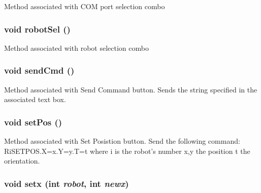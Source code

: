 Method associated with COM port selection combo \hypertarget{classMainWindow_50c5e9556f3dfc6de8e0b064d10aa21f}{
\subsubsection[robotSel]{\setlength{\rightskip}{0pt plus 5cm}void robot\-Sel ()}}
\label{classMainWindow_50c5e9556f3dfc6de8e0b064d10aa21f}


Method associated with robot selection combo \hypertarget{classMainWindow_0cb6bab0d23b55595337ae6f9e8eba32}{
\subsubsection[sendCmd]{\setlength{\rightskip}{0pt plus 5cm}void send\-Cmd ()}}
\label{classMainWindow_0cb6bab0d23b55595337ae6f9e8eba32}


Method associated with Send Command button. Sends the string specified in the associated text box. \hypertarget{classMainWindow_d6073419da050a8657f4adf01acfd2d0}{
\subsubsection[setPos]{\setlength{\rightskip}{0pt plus 5cm}void set\-Pos ()}}
\label{classMainWindow_d6073419da050a8657f4adf01acfd2d0}


Method associated with Set Posistion button. Send the following command: Ri\-SETPOS.X=x.Y=y.T=t where i is the robot's number x,y the position t the orientation. \hypertarget{classMainWindow_06a4601d7b3cecfb4432f48e067ac81d}{
\subsubsection[setx]{\setlength{\rightskip}{0pt plus 5cm}void setx (int {\em robot}, int {\em newx})}}
\label{classMainWindow_06a4601d7b3cecfb4432f48e067ac81d}


